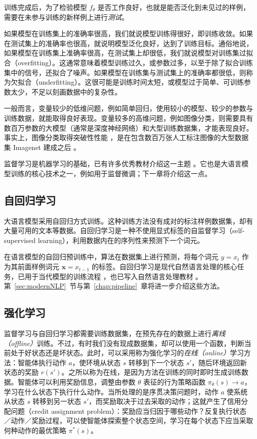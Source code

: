 训练完成后，为了检验模型 $f_\theta$ 是否工作良好，也就是能否泛化到未见过的样例，需要在未参与训练的新样例上进行\textit{测试}。

如果模型在训练集上的准确率很高，我们就说模型训练得很好，即训练收敛。如果在测试集上的准确率也很高，就说明模型泛化良好，达到了训练目标。通俗地说，如果模型在训练集上准确率很高，在测试集上却很低，我们就说模型对训练集过拟合（overfitting）。这通常意味着模型训练过久，或参数过多，以至于除了拟合训练集中的信号，还拟合了噪声。如果模型在训练集与测试集上的准确率都很低，则称为欠拟合（underfitting）。这很可能是训练时间太短，或模型过于简单、可训练参数太少，不足以刻画数据中的复杂性。

一般而言，变量较少的低维问题，例如简单回归，使用较小的模型、较少的参数与训练数据，就能取得良好表现。变量较多的高维问题，例如图像分类，则需要具有数百万参数的大模型（通常是深度神经网络）和大型训练数据集，才能表现良好。事实上，图像分类取得突破性性能 \citep{krizhevsky2012imagenet}，是在包含数百万张人工标注图像的大型数据集 Imagenet 建成之后 \citep{deng2009imagenet}。

监督学习是机器学习的基础，已有许多优秀教材介绍这一主题 \citep{bishop2023deep,goodfellow2016deep}。它也是大语言模型训练的核心技术之一，例如用于监督微调；下一章将介绍这一点。

\subsection{自回归学习}
大语言模型采用自回归方式训练。这种训练方法没有成对的标注样例数据集，却有大量可用的文本等数据。自回归学习是一种不使用显式标签的自监督学习（self-supervised learning），利用数据内在的序列性来预测下一个词元。

在语言模型的自回归预训练中，算法在数据集上进行预测，将每个词元 $y=x_t$ 作为其前面样例词元 $\mathbf{x}=x_{t-1}$ 的标签。自回归学习是现代自然语言处理的核心任务，已用于当代模型的训练流程 \citep{radford2018improving}，也已写入自然语言处理教材 \citep{jm3}。第~\ref{sec:modernNLP}~节与第~\ref{chap:pipeline}~章将进一步介绍这些方法。

\subsection{强化学习}
\label{sec:sdp}\label{sec:rl}
监督学习与自回归学习都需要训练数据集，在预先存在的数据上进行{\em 离线（offline）}训练。不过，有时我们没有现成数据集，却可以使用一个函数，判断当前处于好状态还是坏状态。此时，可以采用称为强化学习的{\em 在线（online）}学习方法：智能体执行动作 $a$，使环境从状态 $s$ 转移到下一个状态 $s'$，随后环境返回新状态的奖励 $r(s')$。之所以称为在线，是因为方法在训练的同时即时生成训练数据。智能体可以利用奖励信息，调整由参数 $\theta$ 表征的行为策略函数 $\pi_\theta(s) \rightarrow a$，学习在什么状态下执行什么动作。当所处理的是序贯决策问题时，动作 $a$ 使系统从状态 $s$ 转移到另一状态 $s'$，而奖励取决于过去采取的动作；这就产生了信用分配问题（credit assignment problem）：奖励应当归因于哪些动作？反复执行状态／动作／奖励过程，可以使智能体探索整个状态空间，学习在每个状态下应当采取何种动作的最优策略 $\pi^*(s)$。

